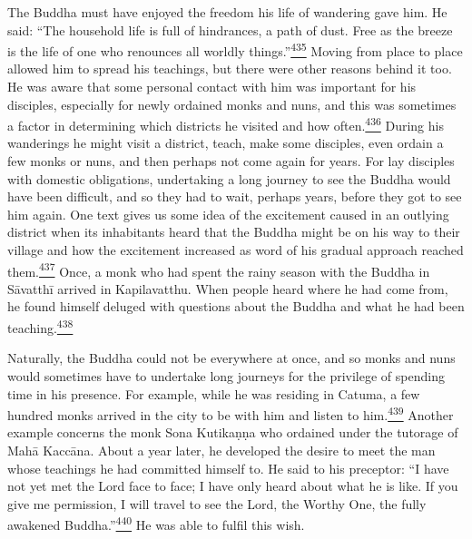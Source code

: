 The Buddha must have enjoyed the freedom his life of wandering gave him.
He said: ``The household life is full of hindrances, a path of dust.
Free as the breeze is the life of one who renounces all worldly
things.''\label{footprints_split_012.html_fnref435}\hyperref[footprints_split_025.htmlux5cux23fn435]{\textsuperscript{435}}
Moving from place to place allowed him to spread his teachings, but
there were other reasons behind it too. He was aware that some personal
contact with him was important for his disciples, especially for newly
ordained monks and nuns, and this was sometimes a factor in determining
which districts he visited and how
often.\label{footprints_split_012.html_fnref436}\hyperref[footprints_split_025.htmlux5cux23fn436]{\textsuperscript{436}}
During his wanderings he might visit a district, teach, make some
disciples, even ordain a few monks or nuns, and then perhaps not come
again for years. For lay disciples with domestic obligations,
undertaking a long journey to see the Buddha would have been difficult,
and so they had to wait, perhaps years, before they got to see him
again. One text gives us some idea of the excitement caused in an
outlying district when its inhabitants heard that the Buddha might be on
his way to their village and how the excitement increased as word of his
gradual approach reached
them.\label{footprints_split_012.html_fnref437}\hyperref[footprints_split_025.htmlux5cux23fn437]{\textsuperscript{437}}
Once, a monk who had spent the rainy season with the Buddha in Sāvatthī
arrived in Kapilavatthu. When people heard where he had come from, he
found himself deluged with questions about the Buddha and what he had
been
teaching.\label{footprints_split_012.html_fnref438}\hyperref[footprints_split_025.htmlux5cux23fn438]{\textsuperscript{438}}

Naturally, the Buddha could not be everywhere at once, and so monks and
nuns would sometimes have to undertake long journeys for the privilege
of spending time in his presence. For example, while he was residing in
Catuma, a few hundred monks arrived in the city to be with him and
listen to
him.\label{footprints_split_012.html_fnref439}\hyperref[footprints_split_025.htmlux5cux23fn439]{\textsuperscript{439}}
Another example concerns the monk Sona Kutikaṇṇa who ordained under the
tutorage of Mahā Kaccāna. About a year later, he developed the desire to
meet the man whose teachings he had committed himself to. He said to his
preceptor: ``I have not yet met the Lord face to face; I have only heard
about what he is like. If you give me permission, I will travel to see
the Lord, the Worthy One, the fully awakened
Buddha.''\label{footprints_split_012.html_fnref440}\hyperref[footprints_split_025.htmlux5cux23fn440]{\textsuperscript{440}}
He was able to fulfil this wish.

